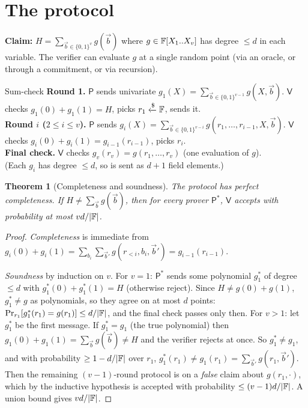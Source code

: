 \documentclass[11pt,a4paper]{report}
\theoremstyle{plain}
\newtheorem{theorem}{Theorem}[chapter]
\theoremstyle{definition}
\theoremstyle{remark}
\newcommand{\getsr}{\xleftarrow{\$}}
\renewcommand{\Pr}{\mathrm{Pr}}
\newcommand{\Prv}{\mathsf{P}}\newcommand{\Ver}{\mathsf{V}}
\begin{document}
\section{The protocol}
\textbf{Claim:} $H=\sum_{\vec b\in\{0,1\}^v}g(\vec b)$ where $g\in\mathbb{F}[X_1..X_v]$ has degree $\le d$ in each variable. The verifier can evaluate $g$ at a single random point (via an oracle, or through a commitment, or via recursion).
\begin{protocol}[label=pr:sumcheck]{Sum-check}
\textbf{Round 1.} $\Prv$ sends univariate $g_1(X)=\sum_{\vec b\in\{0,1\}^{v-1}}g(X,\vec b)$. $\Ver$ checks $g_1(0)+g_1(1)=H$, picks $r_1\getsr\FF$, sends it.\\
\textbf{Round $i$ ($2\le i\le v$).} $\Prv$ sends $g_i(X)=\sum_{\vec b\in\{0,1\}^{v-i}}g(r_1,\dots,r_{i-1},X,\vec b)$. $\Ver$ checks $g_i(0)+g_i(1)=g_{i-1}(r_{i-1})$, picks $r_i$.\\
\textbf{Final check.} $\Ver$ checks $g_v(r_v)=g(r_1,\dots,r_v)$ (one evaluation of $g$).\\
(Each $g_i$ has degree $\le d$, so is sent as $d+1$ field elements.)
\end{protocol}
\begin{center}
\end{center}
\begin{theorem}[Completeness and soundness]\label{thm:sumcheck}
The protocol has perfect completeness. If $H\ne\sum_{\vec b}g(\vec b)$, then for every prover $\Prv^*$, $\Ver$ accepts with probability at most $vd/|\mathbb{F}|$.
\end{theorem}
\begin{proof}
\emph{Completeness} is immediate from $g_i(0)+g_i(1)=\sum_{b_i}\sum_{\vec b'}g(r_{<i},b_i,\vec b')=g_{i-1}(r_{i-1})$.

\emph{Soundness} by induction on $v$. For $v=1$: $\Prv^*$ sends some polynomial $g_1^*$ of degree $\le d$ with $g_1^*(0)+g_1^*(1)=H$ (otherwise reject). Since $H\ne g(0)+g(1)$, $g_1^*\ne g$ as polynomials, so they agree on at most $d$ points: $\Pr_{r_1}[g_1^*(r_1)=g(r_1)]\le d/|\FF|$, and the final check passes only then. For $v>1$: let $g_1^*$ be the first message. If $g_1^*=g_1$ (the true polynomial) then $g_1(0)+g_1(1)=\sum_{\vec b}g(\vec b)\ne H$ and the verifier rejects at once. So $g^*_1\ne g_1$, and with probability $\ge1-d/|\mathbb{F}|$ over $r_1$, $g_1^*(r_1)\ne g_1(r_1)=\sum_{\vec b'}g(r_1,\vec b')$. Then the remaining $(v-1)$-round protocol is on a \emph{false} claim about $g(r_1,\cdot)$, which by the inductive hypothesis is accepted with probability $\le(v-1)d/|\mathbb{F}|$. A union bound gives $vd/|\mathbb{F}|$.
\end{proof}
\end{document}
